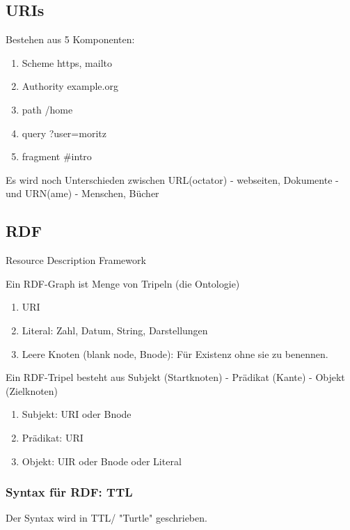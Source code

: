 \documentclass[a4paper]{article}
\begin{document}
\subsection{URIs}


Bestehen aus 5 Komponenten:

\begin{enumerate}
    \item Scheme https, mailto
    \item Authority example.org
    \item path /home
    \item query ?user=moritz
    \item fragment \#intro
\end{enumerate}

Es wird noch Unterschieden zwischen URL(octator) - webseiten, Dokumente - und URN(ame) - Menschen, Bücher

\subsection{RDF}

Resource Description Framework

Ein RDF-Graph ist Menge von Tripeln (die Ontologie)

\begin{enumerate}
    \item URI
    \item Literal: Zahl, Datum, String, Darstellungen
    \item Leere Knoten (blank node, Bnode): Für Existenz ohne sie zu benennen.
\end{enumerate}

Ein RDF-Tripel besteht aus Subjekt (Startknoten) - Prädikat (Kante) - Objekt (Zielknoten)

\begin{enumerate}
    \item Subjekt: URI oder Bnode
    \item Prädikat: URI
    \item Objekt: UIR oder Bnode oder Literal
\end{enumerate}

\subsubsection{Syntax für RDF: TTL}

Der Syntax wird in TTL/ "Turtle" geschrieben.
\end{document}
